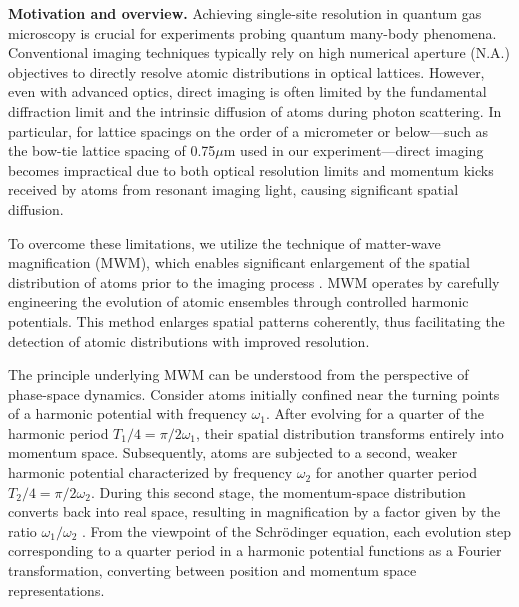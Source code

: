 
\textbf{Motivation and overview.} 
Achieving single-site resolution in quantum gas microscopy is crucial for experiments probing quantum many-body phenomena. Conventional imaging techniques typically rely on high numerical aperture (N.A.) objectives to directly resolve atomic distributions in optical lattices. However, even with advanced optics, direct imaging is often limited by the fundamental diffraction limit and the intrinsic diffusion of atoms during photon scattering. In particular, for lattice spacings on the order of a micrometer or below—such as the bow-tie lattice spacing of 0.75$\mu$m used in our experiment—direct imaging becomes impractical due to both optical resolution limits and momentum kicks received by atoms from resonant imaging light, causing significant spatial diffusion.

To overcome these limitations, we utilize the technique of matter-wave magnification (MWM), which enables significant enlargement of the spatial distribution of atoms prior to the imaging process \cite{huang_construction_2024}. MWM operates by carefully engineering the evolution of atomic ensembles through controlled harmonic potentials. This method enlarges spatial patterns coherently, thus facilitating the detection of atomic distributions with improved resolution.

The principle underlying MWM can be understood from the perspective of phase-space dynamics. Consider atoms initially confined near the turning points of a harmonic potential with frequency $\omega_1$. After evolving for a quarter of the harmonic period $T_1/4=\pi/2\omega_1$, their spatial distribution transforms entirely into momentum space. Subsequently, atoms are subjected to a second, weaker harmonic potential characterized by frequency $\omega_2$ for another quarter period $T_2/4=\pi/2\omega_2$. During this second stage, the momentum-space distribution converts back into real space, resulting in magnification by a factor given by the ratio $\omega_1/\omega_2$ \cite{huang_construction_2024}. From the viewpoint of the Schrödinger equation, each evolution step corresponding to a quarter period in a harmonic potential functions as a Fourier transformation, converting between position and momentum space representations.


